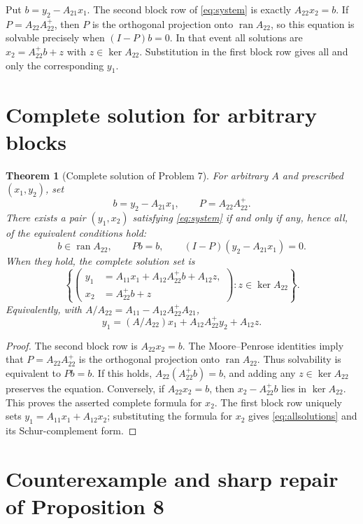\documentclass[11pt]{article}
\newtheorem{theorem}{Theorem}
\newcommand{\ran}{\operatorname{ran}}
\begin{document}
Put $b=y_2-A_{21}x_1$.  The second block row of \eqref{eq:system} is exactly
$A_{22}x_2=b$.  If $P=A_{22}A_{22}^{+}$, then $P$ is the orthogonal
projection onto $\ran A_{22}$, so this equation is solvable precisely when
$(I-P)b=0$.  In that event all solutions are
$x_2=A_{22}^{+}b+z$ with $z\in\ker A_{22}$.  Substitution in the first block
row gives all and only the corresponding $y_1$.

\section{Complete solution for arbitrary blocks}

\begin{theorem}[Complete solution of Problem 7]\label{thm:complete}
For arbitrary $A$ and prescribed $(x_1,y_2)$, set
\[
 b=y_2-A_{21}x_1,\qquad P=A_{22}A_{22}^{+}.
\]
There exists a pair $(y_1,x_2)$ satisfying \eqref{eq:system} if and only if
any, hence all, of the equivalent conditions hold:
\[
 b\in\ran A_{22},\qquad Pb=b,
 \qquad (I-P)(y_2-A_{21}x_1)=0.
\]
When they hold, the complete solution set is
\begin{equation}\label{eq:allsolutions}
 \left\{
 \left(
 \begin{aligned}
 y_1&=A_{11}x_1+A_{12}A_{22}^{+}b+A_{12}z,\\
 x_2&=A_{22}^{+}b+z
 \end{aligned}
 \right):z\in\ker A_{22}
 \right\}.
\end{equation}
Equivalently, with $A/A_{22}=A_{11}-A_{12}A_{22}^{+}A_{21}$,
\[
 y_1=(A/A_{22})x_1+A_{12}A_{22}^{+}y_2+A_{12}z.
\]
\end{theorem}

\begin{proof}
The second block row is $A_{22}x_2=b$.  The Moore--Penrose identities imply
that $P=A_{22}A_{22}^{+}$ is the orthogonal projection onto
$\ran A_{22}$.  Thus solvability is equivalent to $Pb=b$.  If this holds,
$A_{22}(A_{22}^{+}b)=b$, and adding any $z\in\ker A_{22}$ preserves the
equation.  Conversely, if $A_{22}x_2=b$, then
$x_2-A_{22}^{+}b$ lies in $\ker A_{22}$.  This proves the asserted complete
formula for $x_2$.  The first block row uniquely sets
$y_1=A_{11}x_1+A_{12}x_2$; substituting the formula for $x_2$ gives
\eqref{eq:allsolutions} and its Schur-complement form.
\end{proof}

\section{Counterexample and sharp repair of Proposition 8}
\end{document}
